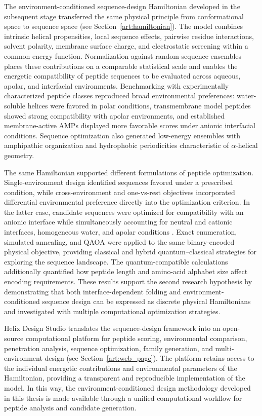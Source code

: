 The environment-conditioned sequence-design Hamiltonian developed in the subsequent stage transferred the same physical principle from conformational space to sequence space \cite{DANI_HAMILTONIAN} (see Section~\ref{art:hamiltonian}). The model combines intrinsic helical propensities, local sequence effects, pairwise residue interactions, solvent polarity, membrane surface charge, and electrostatic screening within a common energy function. Normalization against random-sequence ensembles places these contributions on a comparable statistical scale and enables the energetic compatibility of peptide sequences to be evaluated across aqueous, apolar, and interfacial environments. Benchmarking with experimentally characterized peptide classes reproduced broad environmental preferences: water-soluble helices were favored in polar conditions, transmembrane model peptides showed strong compatibility with apolar environments, and established membrane-active AMPs displayed more favorable scores under anionic interfacial conditions. Sequence optimization also generated low-energy ensembles with amphipathic organization and hydrophobic periodicities characteristic of $\alpha$-helical geometry.

The same Hamiltonian supported different formulations of peptide optimization. Single-environment design identified sequences favored under a prescribed condition, while cross-environment and one-vs-rest objectives incorporated differential environmental preference directly into the optimization criterion. In the latter case, candidate sequences were optimized for compatibility with an anionic interface while simultaneously accounting for neutral and cationic interfaces, homogeneous water, and apolar conditions \cite{DANI_HAMILTONIAN}. Exact enumeration, simulated annealing, and QAOA were applied to the same binary-encoded physical objective, providing classical and hybrid quantum--classical strategies for exploring the sequence landscape. The quantum-compatible calculations additionally quantified how peptide length and amino-acid alphabet size affect encoding requirements. These results support the second research hypothesis by demonstrating that both interface-dependent folding and environment-conditioned sequence design can be expressed as discrete physical Hamiltonians and investigated with multiple computational optimization strategies.

Helix Design Studio translates the sequence-design framework into an open-source computational platform for peptide scoring, environmental comparison, penetration analysis, sequence optimization, family generation, and multi-environment design (see Section~\ref{art:web_page}). The platform retains access to the individual energetic contributions and environmental parameters of the Hamiltonian, providing a transparent and reproducible implementation of the model. In this way, the environment-conditioned design methodology developed in this thesis is made available through a unified computational workflow for peptide analysis and candidate generation.

